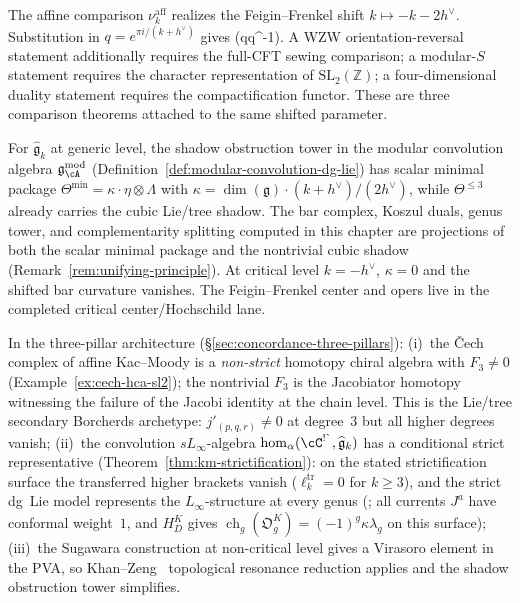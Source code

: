 The affine comparison $\nu_k^{\mathrm{aff}}$ realizes the
Feigin--Frenkel shift $k\mapsto-k-2h^\vee$.  Substitution in
\(q=e^{\pi i/(k+h^\vee)}\) gives (q\mapsto q^{-1}).  A WZW
orientation-reversal statement additionally requires the full-CFT
sewing comparison; a modular-$S$ statement requires the character
representation of $\mathrm{SL}_2(\mathbb Z)$; a four-dimensional
duality statement requires the compactification functor.  These are
three comparison theorems attached to the same shifted parameter.

\begin{remark}\label{rem:km-master-mc}
For $\widehat{\mathfrak{g}}_k$ at generic level, the shadow
obstruction tower in the modular convolution algebra
$\mathfrak{g}^{\mathrm{mod}}_\cA$
(Definition~\ref{def:modular-convolution-dg-lie}) has scalar
minimal package $\Theta^{\min} = \kappa \cdot \eta \otimes \Lambda$
with
$\kappa = \dim(\mathfrak{g})\cdot(k+h^\vee)/(2h^\vee)$, while
$\Theta^{\leq 3}$ already carries the cubic Lie/tree shadow.
The bar complex, Koszul duals, genus tower, and complementarity
splitting computed in this chapter are projections of both the
scalar minimal package and the nontrivial cubic shadow
\textup{(}Remark~\textup{\ref{rem:unifying-principle}}\textup{)}.
At critical level $k = -h^\vee$, $\kappa = 0$ and the shifted bar
curvature vanishes. The Feigin--Frenkel center and opers live in the
completed critical center/Hochschild lane.
\end{remark}

\begin{remark}
\label{rem:km-three-pillar}
In the three-pillar architecture
(\S\ref{sec:concordance-three-pillars}):
(i)~the \v{C}ech complex of affine Kac--Moody is a \emph{non-strict}
homotopy chiral algebra with $F_3 \neq 0$
(Example~\ref{ex:cech-hca-sl2}); the nontrivial $F_3$ is the Jacobiator
homotopy witnessing the failure of the Jacobi identity at the chain level.
This is the Lie/tree secondary Borcherds archetype:
$j'_{(p,q,r)} \neq 0$ at degree~$3$ but all higher degrees vanish;
(ii)~the convolution $sL_\infty$-algebra
$\operatorname{hom}_\alpha(\cC^{\textup{!\textasciigrave}}, \widehat{\mathfrak{g}}_k)$
has a conditional strict representative
(Theorem~\ref{thm:km-strictification}): on the stated strictification
surface the transferred higher brackets vanish
($\ell_k^{\mathrm{tr}} = 0$ for $k \geq 3$), and the strict dg~Lie
model represents the $L_\infty$-structure at every genus
\textup{(}; all currents $J^a$ have conformal weight~$1$, and
$H_D^K$ gives
$\operatorname{ch}_g(\mathfrak O_g^K)=(-1)^g\kappa\lambda_g$
on this surface\textup{)};
(iii)~the Sugawara construction at non-critical level gives a Virasoro
element in the PVA, so Khan--Zeng~\cite{KZ25} topological resonance
reduction applies and the shadow obstruction tower simplifies.
\end{remark}

